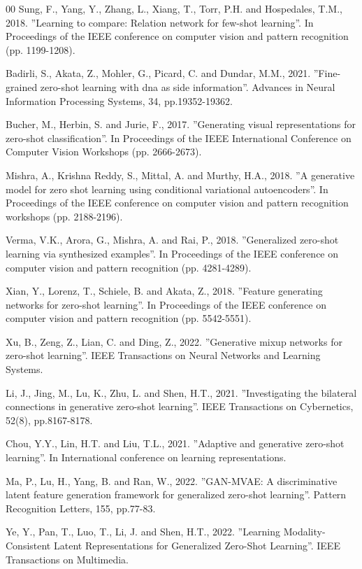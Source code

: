 \documentclass{article}
\begin{document}
\begin{thebibliography}{00}
 Sung, F., Yang, Y., Zhang, L., Xiang, T., Torr, P.H. and Hospedales, T.M., 2018. ''Learning to compare: Relation network for few-shot learning''. In Proceedings of the IEEE conference on computer vision and pattern recognition (pp. 1199-1208).

 Badirli, S., Akata, Z., Mohler, G., Picard, C. and Dundar, M.M., 2021. ''Fine-grained zero-shot learning with dna as side information''. Advances in Neural Information Processing Systems, 34, pp.19352-19362.

 Bucher, M., Herbin, S. and Jurie, F., 2017. ''Generating visual representations for zero-shot classification''. In Proceedings of the IEEE International Conference on Computer Vision Workshops (pp. 2666-2673).

 Mishra, A., Krishna Reddy, S., Mittal, A. and Murthy, H.A., 2018. ''A generative model for zero shot learning using conditional variational autoencoders''. In Proceedings of the IEEE conference on computer vision and pattern recognition workshops (pp. 2188-2196).

 Verma, V.K., Arora, G., Mishra, A. and Rai, P., 2018. ''Generalized zero-shot learning via synthesized examples''. In Proceedings of the IEEE conference on computer vision and pattern recognition (pp. 4281-4289).

 Xian, Y., Lorenz, T., Schiele, B. and Akata, Z., 2018. ''Feature generating networks for zero-shot learning''. In Proceedings of the IEEE conference on computer vision and pattern recognition (pp. 5542-5551).

 Xu, B., Zeng, Z., Lian, C. and Ding, Z., 2022. ''Generative mixup networks for zero-shot learning''. IEEE Transactions on Neural Networks and Learning Systems.

 Li, J., Jing, M., Lu, K., Zhu, L. and Shen, H.T., 2021. ''Investigating the bilateral connections in generative zero-shot learning''. IEEE Transactions on Cybernetics, 52(8), pp.8167-8178.

 Chou, Y.Y., Lin, H.T. and Liu, T.L., 2021. ''Adaptive and generative zero-shot learning''. In International conference on learning representations.

 Ma, P., Lu, H., Yang, B. and Ran, W., 2022. ''GAN-MVAE: A discriminative latent feature generation framework for generalized zero-shot learning''. Pattern Recognition Letters, 155, pp.77-83.

 Ye, Y., Pan, T., Luo, T., Li, J. and Shen, H.T., 2022. ''Learning Modality-Consistent Latent Representations for Generalized Zero-Shot Learning''. IEEE Transactions on Multimedia.


\end{thebibliography}
\end{document}
